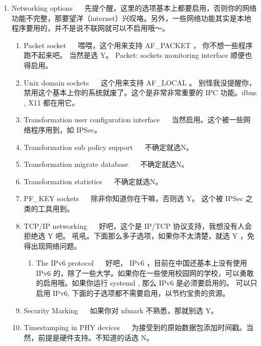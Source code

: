\begin{enumerate}
\item Networking options ~~ 先提个醒，这里的选项基本上都要启用，否则你的网络功能不完整，那要望洋（internet）兴叹咯。另外，一些网络功能其实是本地程序要用的，并不是说不联网就可以不启用哦～。


\begin{enumerate}

\renewcommand{\labelenumii}{\roman{enumii}.}

\item Packet socket ~~ 喂喂，这个用来支持 AF\_PACKET ， 你不想一些程序跑不起来吧。 当然是选 Y。  Packet: sockets monitoring interface 顺便也得启用。
\item Unix domain sockets ~~ 这个用来支持 AF\_LOCAL 。 别怪我没提醒你， 禁用这个基本上你的系统就废了。这个是非常非常重要的 IPC 功能。dbus , X11 都在用它。

\item Transformation user configuration interface ~~ 当然启用。这个被一些网络程序用到，如 IPSec。

\item Transformation sub policy support ~~ 不确定就选N。
\item Transformation migrate database ~~ 不确定就选N。
\item Transformation statistics ~~ 不确定就选N。
 
\item  PF\_KEY sockets ~~ 除非你知道你在干嘛，否则选 Y。 这个被 IPSec 之类的工具用到。
\item TCP/IP networking ~~ 好吧，这个是 IP/TCP 协议支持，我想没有人会拒绝选 Y 吧。 吼吼。下面那么多子选项，如果你不太清楚，就选 Y ，免得出现网络问题。

\begin{enumerate}

\item The IPv6 protocol ~~ 好吧， IPv6 ，目前在中国还基本上没有使用 IPv6 的，除了一些大学。如果你在一些使用校园网的学校，可以勇敢的启用哦。如果你运行 systemd , 那么 IPv6 是必须要启用的。
可以只启用  IPv6, 下面的子选项都不需要启用，以节约宝贵的资源。

\end{enumerate}

\item Security Marking ~~ 如果你对 nfmark 不熟悉，那就别选 Y。
\item Timestamping in PHY devices ~~ 为接受到的原始数据包添加时间戳。当然，前提是硬件支持。不知道的话选 N。


\end{enumerate}
\end{enumerate}
